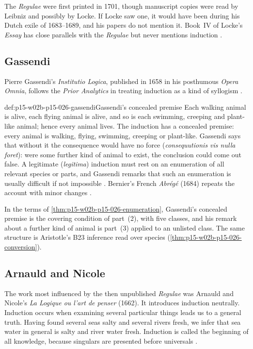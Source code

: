 The \emph{Regulae} were first printed in 1701, though manuscript copies
were read by Leibniz and possibly by Locke. If Locke saw one, it would have
been during his Dutch exile of 1683--1689, and his papers do not mention
it. Book~IV of Locke's \emph{Essay} has close parallels with the
\emph{Regulae} but never mentions induction
\cite[p.~29, n.~20]{Milton2011InductionBeforeHume}.

\subsection{Gassendi}

Pierre Gassendi's \emph{Institutio Logica}, published in 1658 in his
posthumous \emph{Opera Omnia}, follows the \emph{Prior Analytics} in
treating induction as a kind of syllogism
\cite[pp.~29--30]{Milton2011InductionBeforeHume}.

\begin{hbexample}{def:p15-w02b-p15-026-gassendi}{Gassendi's concealed premise}
Each walking animal is alive, each flying animal is alive, and so is
each swimming, creeping and plant-like animal; hence every animal lives.
The induction has a concealed premise: every animal is walking, flying,
swimming, creeping or plant-like. Gassendi says that without it the consequence would
have no force (\emph{consequutionis vis nulla foret}): were some further
kind of animal to exist, the conclusion could come out false. A legitimate
(\emph{legitima}) induction must rest on an enumeration of all relevant
species or parts, and Gassendi remarks that such an enumeration is usually
difficult if not impossible \cite[p.~30]{Milton2011InductionBeforeHume}.
Bernier's French \emph{Abr\'eg\'e} (1684) repeats the account with minor
changes \cite[p.~30]{Milton2011InductionBeforeHume}.
\end{hbexample}

In the terms of \cref{thm:p15-w02b-p15-026-enumeration}, Gassendi's
concealed premise is the covering condition of part~(2), with five
classes, and his remark about a further kind of animal is part~(3) applied
to an unlisted class. The same structure is Aristotle's B23 inference read
over species (\cref{thm:p15-w02b-p15-026-conversion}).

\subsection{Arnauld and Nicole}

The work most influenced by the then unpublished \emph{Regulae} was
Arnauld and Nicole's \emph{La Logique ou l'art de penser} (1662). It
introduces induction neutrally. Induction occurs when examining several
particular things leads us to a general truth. Having found several seas
salty and several rivers fresh, we infer that sea water in general is salty
and river water fresh. Induction is called the beginning of all knowledge,
because singulars are presented before universals
\cite[p.~30]{Milton2011InductionBeforeHume}.

